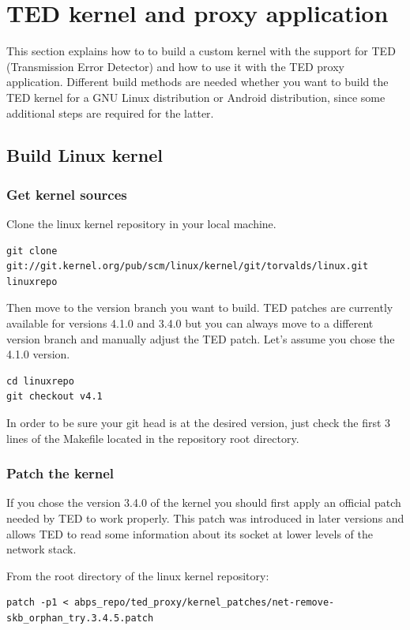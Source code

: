 \documentclass[a4paper]{article}
\begin{document}
\section{TED kernel and proxy application}
This section explains how to to build a custom kernel with the support for TED (Transmission Error Detector) 
and how to use it with the TED proxy application. Different build methods are needed whether you
 want to build the TED kernel for a GNU Linux distribution or Android distribution, since some additional 
steps are required for the latter.

\subsection{Build Linux kernel}
\subsubsection{Get kernel sources}
Clone the linux kernel repository in your local machine.

\begin{lstlisting}
git clone git://git.kernel.org/pub/scm/linux/kernel/git/torvalds/linux.git linuxrepo
\end{lstlisting}

Then move to the version branch you want to build. 
TED patches are currently available for versions 4.1.0 and 3.4.0 but you can always move to a different version branch
and manually adjust the TED patch. Let's assume you chose the 4.1.0 version.

\begin{lstlisting}
cd linuxrepo
git checkout v4.1
\end{lstlisting}

In order to be sure your git head is at the desired version, just check the first 3 lines
of the Makefile located in the repository root directory.

\subsubsection{Patch the kernel}
If you chose the version 3.4.0 of the kernel you should first apply an official 
 patch needed by TED to work properly. This patch was introduced in later versions and allows
 TED to read some information about its socket at lower levels of the network stack.

From the root directory of the linux kernel repository:

\begin{lstlisting}
patch -p1 < abps_repo/ted_proxy/kernel_patches/net-remove-skb_orphan_try.3.4.5.patch
\end{lstlisting}
\end{document}
